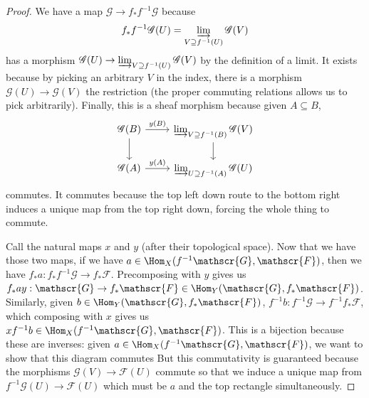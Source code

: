 \begin{proof}
	We have a map $\mathscr{G} \to f_\ast f^{-1} \mathscr{G} $ because
	\[
		f_\ast f^{-1}\mathscr{G}(U) = \varinjlim_{V \supseteq f^{-1}(U)} \mathscr{G}(V)
	\] 
	has a morphism $\mathscr{G}(U) \to \varinjlim_{V \supseteq f^{-1}(U)} \mathscr{G}(V) $ by the definition of a limit.
	It exists because by picking an arbitrary $V $ in the index, there is a morphism $\mathscr{G}(U) \to \mathscr{G}(V) $ the restriction (the proper commuting relations allows us to pick arbitrarily).
	Finally, this is a sheaf morphism because given $A \subseteq B $,
	\[
	\begin{tikzcd}
	\mathscr{G}(B) & \varinjlim_{V \supseteq f^{-1}(B)} \mathscr{G}(V)\\
	\mathscr{G}(A) & \varinjlim_{U \supseteq f^{-1}(A)} \mathscr{G}(U)
	\arrow["y(B)",from=1-1,to=1-2]
	\arrow[from=1-1,to=2-1]
	\arrow["y(A)",from=2-1,to=2-2]
	\arrow[from=1-2,to=2-2]
	\end{tikzcd}
	\]
	commutes.
	It commutes because the top left down route to the bottom right induces a unique map from the top right down, forcing the whole thing to commute.

	Call the natural maps $x $ and $y $ (after their topological space).
	Now that we have those two maps, if we have $a \in \Hom_X(f^{-1}\mathscr{G},\mathscr{F}) $, then we have $f_\ast a: f_\ast f^{-1} \mathscr{G} \to f_\ast \mathscr{F} $.
	Precomposing with $y $ gives us $f_\ast a y: \mathscr{G} \to f_\ast \mathscr{F} \in \Hom_Y(\mathscr{G},f_\ast \mathscr{F}) $.
	Similarly, given $b \in \Hom_Y(\mathscr{G},f_\ast \mathscr{F})$, $f^{-1}b: f^{-1}\mathscr{G} \to f^{-1}f_\ast \mathscr{F}$, which composing with $x $ gives us $xf^{-1}b \in \Hom_X(f^{-1}\mathscr{G}, \mathscr{F})$.
	This is a bijection because these are inverses: given $a \in \Hom_X(f^{-1}\mathscr{G},\mathscr{F}) $,
	we want to show that this diagram commutes
	But this commutativity is guaranteed because the morphisms $\mathscr{G}(V) \to \mathscr{F}(U) $ commute so that we induce a unique map from $f^{-1}\mathscr{G}(U)\to \mathscr{F}(U) $ which must be $a $ and the top rectangle simultaneously.
\end{proof}

